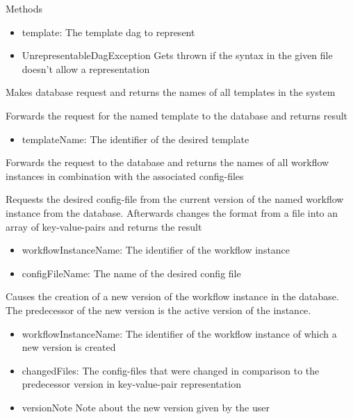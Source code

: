 \begin{methodenv}{Methods}
\begin{itemize}
	\item{template:}
	The template dag to represent
\end{itemize}

\begin{itemize}
	\item{UnrepresentableDagException}
	Gets thrown if the syntax in the given file doesn't allow a representation
\end{itemize}

Makes database request and returns the names of all templates in the system

Forwards the request for the named template to the database and returns result

\begin{itemize}
	\item{templateName:}
	The identifier of the desired template
\end{itemize}

Forwards the request to the database and returns the names of all workflow instances in combination with the associated config-files

Requests the desired config-file from the current version of the named workflow instance from the database. Afterwards changes the format from a file into an array of key-value-pairs and returns the result

\begin{itemize}
	\item{workflowInstanceName:}
	The identifier of the workflow instance
	\item{configFileName:}
	The name of the desired config file
\end{itemize}

Causes the creation of a new version of the workflow instance in the database. The predecessor of the new version is the active version of the instance.

\begin{itemize}
	\item{workflowInstanceName:}
	The identifier of the workflow instance of which a new version is created
	\item{changedFiles:}
	The config-files that were changed in comparison to the predecessor version in key-value-pair representation
	\item{versionNote}
	Note about the new version given by the user
\end{itemize}


\end{methodenv}
